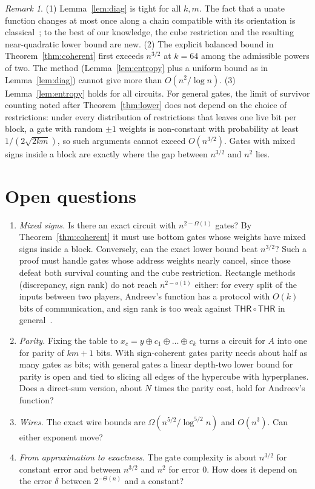 \documentclass[11pt,letterpaper]{article}
\theoremstyle{remark}
\newtheorem*{remark}{Remark}
\newcommand{\sect}[1]{\section{\texorpdfstring{\color{ink}#1}{#1}}}
\newcommand{\THR}{\mathsf{THR}}
\begin{document}
\begin{remark}
(1) Lemma~\ref{lem:diag} is tight for all $k,m$. The fact that a
unate function changes at most once along a chain compatible with its
orientation is classical~\cite[Lemma~2.1]{IPS}; to the best of our knowledge,
the cube restriction and the resulting near-quadratic lower bound are new.
(2) The explicit balanced bound in Theorem~\ref{thm:coherent} first exceeds
$n^{3/2}$ at $k=64$ among the admissible powers of two. The method
(Lemma~\ref{lem:entropy} plus a uniform bound as in Lemma~\ref{lem:diag})
cannot give more than $O(n^2/\log n)$. (3) Lemma~\ref{lem:entropy} holds for
all circuits. For general gates, the limit of survivor counting noted after
Theorem~\ref{thm:lower} does not depend on the choice of restrictions: under
every distribution of restrictions that leaves one live bit per block, a
gate with random $\pm1$ weights is non-constant with probability at least
$1/(2\sqrt{2km})$, so such arguments cannot exceed $O(n^{3/2})$. Gates with mixed signs inside a block are exactly where
the gap between $n^{3/2}$ and $n^2$ lies.
\end{remark}


\sect{Open questions}\label{sec:open}

\begin{enumerate}
\item \emph{Mixed signs.} Is there an exact circuit with $n^{2-\Omega(1)}$
  gates? By Theorem~\ref{thm:coherent} it must use bottom gates whose weights
  have mixed signs inside a block. Conversely, can the exact lower bound beat
  $n^{3/2}$? Such a proof must handle gates whose address weights nearly
  cancel, since those defeat both survival counting and the cube restriction.
  Rectangle methods (discrepancy, sign rank) do not reach $n^{2-o(1)}$
  either: for every split of the inputs between two players, Andreev's
  function has a protocol with $O(k)$ bits of communication, and sign rank
  is too weak against $\THR\circ\THR$ in general~\cite{CM}.
\item \emph{Parity.} Fixing the table to $x_c=y\oplus c_1\oplus\dots\oplus c_k$
  turns a circuit for $A$ into one for parity of $km+1$ bits. With
  sign-coherent gates parity needs about half as many gates as bits; with
  general gates a linear depth-two lower bound for parity is open and tied to
  slicing all edges of the hypercube with hyperplanes. Does a direct-sum
  version, about $N$ times the parity cost, hold for Andreev's function?
\item \emph{Wires.} The exact wire bounds are $\Omega(n^{5/2}/\log^{5/2}n)$
  and $O(n^3)$. Can either exponent move?
\item \emph{From approximation to exactness.} The gate complexity is about
  $n^{3/2}$ for constant error and between $n^{3/2}$ and $n^2$ for error $0$.
  How does it depend on the error $\delta$ between $2^{-\Theta(n)}$ and a
  constant?
\end{enumerate}
\end{document}
